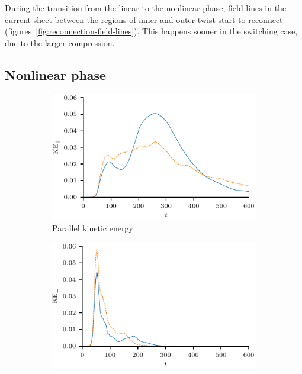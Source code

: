 During the transition from the linear to the nonlinear phase, field lines in the current sheet between the regions of inner and outer twist start to reconnect (figures~\ref{fig:reconnection-field-lines}). This happens sooner in the switching case, due to the larger compression.

\subsection{Nonlinear phase}

\begin{figure}[t]
    \centering
    \begin{subfigure}[t]{0.49\textwidth}
      \centering
      \includegraphics[width=\linewidth]{parallel_kinetic_energy_over_time.pdf}
      \caption{Parallel kinetic energy}
      \label{fig:parallel_kinetic_energy_over_time}
    \end{subfigure}%
    \begin{subfigure}[t]{0.49\textwidth}
      \centering
      \includegraphics[width=\linewidth]{perp_kinetic_energy_over_time.pdf}

\end{subfigure}
\end{figure}
